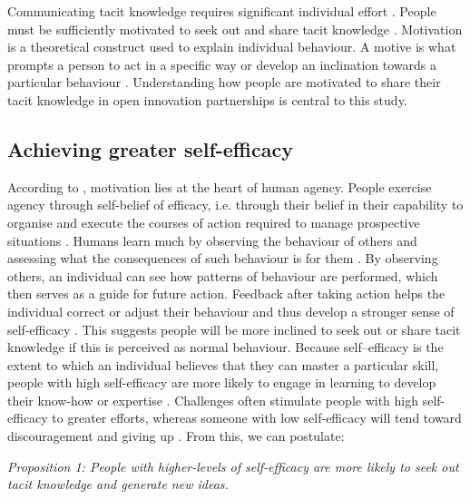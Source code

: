 Communicating tacit knowledge requires significant individual effort \citep{linde2001narrative,desouza2003facilitating}. People must be sufficiently motivated to seek out and share tacit knowledge \citep{leonard1998role}. Motivation is a theoretical construct used to explain individual behaviour. A motive is what prompts a person to act in a specific way or develop an inclination towards a particular behaviour \citep{pardee1990motivation}. Understanding how people are motivated to share their tacit knowledge in open innovation partnerships is central to this study. \medskip

\subsection{Achieving greater self-efficacy}

According to \citet{bandura1989human}, motivation lies at the heart of human agency. People exercise agency through self-belief of efficacy, i.e. through their belief in their capability to organise and execute the courses of action required to manage prospective situations \citep{white1959motivation, bandura1994self}. Humans learn much by observing the behaviour of others and assessing what the consequences of such behaviour is for them \citep{bandura1999social}. By observing others, an individual can see how patterns of behaviour are performed, which then serves as a guide for future action. Feedback after taking action helps the individual correct or adjust their behaviour and thus develop a stronger sense of self-efficacy \citep{bandura1977self}. This suggests people will be more inclined to seek out or share tacit knowledge if this is perceived as normal behaviour. Because self–efficacy is the extent to which an individual believes that they can master a particular skill, people with high self-efficacy are more likely to engage in learning to develop their know-how or expertise \citep{bandura1986social,gist1989influence,zimmerman2000self}. Challenges often stimulate people with high self-efficacy to greater efforts, whereas someone with low self-efficacy will tend toward discouragement and giving up \citep{gist1992self,zimmerman1992self}. From this, we can postulate: \medskip

\begin{tcolorbox}
\emph{Proposition 1: People with higher-levels of self-efficacy are more likely to seek out tacit knowledge and generate new ideas.}
\end{tcolorbox}

